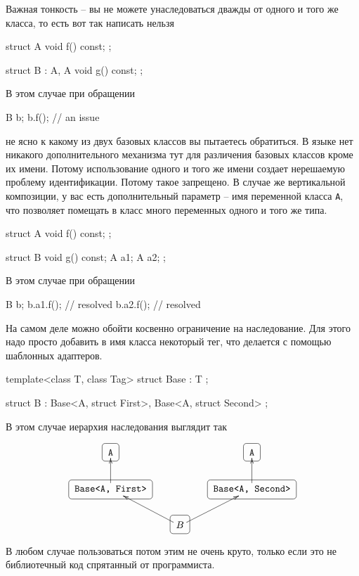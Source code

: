 Важная тонкость -- вы не можете унаследоваться дважды от одного и того же класса, то есть вот так написать нельзя
\begin{cppcode}
struct A {
  void f() const;
};

struct B : A, A {
  void g() const;
};
\end{cppcode}
В этом случае при обращении
\begin{cppcode}
B b;
b.f(); // an issue
\end{cppcode}
не ясно к какому из двух базовых классов вы пытаетесь обратиться.
В языке нет никакого дополнительного механизма тут для различения базовых классов кроме их имени.
Потому использование одного и того же имени создает нерешаемую проблему идентификации.
Потому такое запрещено.
В случае же вертикальной композиции, у вас есть дополнительный параметр -- имя переменной класса \verb"A", что позволяет помещать в класс много переменных одного и того же типа.
\begin{cppcode}
struct A {
  void f() const;
};

struct B {
  void g() const;
  A a1;
  A a2;
};
\end{cppcode}
В этом случае при обращении
\begin{cppcode}
B b;
b.a1.f(); // resolved
b.a2.f(); // resolved
\end{cppcode}
На самом деле можно обойти косвенно ограничение на наследование.
Для этого надо просто добавить в имя класса некоторый тег, что делается с помощью шаблонных адаптеров.
\begin{cppcode}
template<class T, class Tag>
struct Base : T {};

struct B : Base<A, struct First>, Base<A, struct Second> {};
\end{cppcode}
В этом случае иерархия наследования выглядит так
\begin{center}
\[
\xymatrix{
  {\texttt{A}}
  	{\save
   [].[]*+[F-:<3pt>]\frm{}
   \restore
	}
  &{}&{\texttt{A}}
   	{\save
   [].[]*+[F-:<3pt>]\frm{}
   \restore
	}
  \\
  {\texttt{Base<A, First>}}\ar[u]
   	{\save
   [].[]*+[F-:<3pt>]\frm{}
   \restore
	}
  &{}&{\texttt{Base<A, Second>}}\ar[u]
   	{\save
   [].[]*+[F-:<3pt>]\frm{}
   \restore
	}
  \\
  {}&{B}\ar[ul]\ar[ur]
   	{\save
   [].[]*+[F-:<3pt>]\frm{}
   \restore
	}
  &{}\\
}
\]
\end{center}
В любом случае пользоваться потом этим не очень круто, только если это не библиотечный код спрятанный от программиста.


